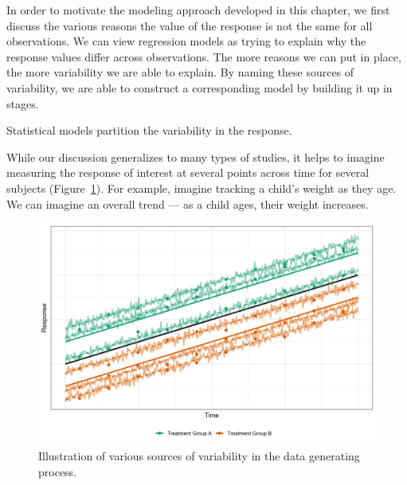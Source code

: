 \documentclass[
  letterpaper,
  DIV=11,
  numbers=noendperiod]{scrreprt}
\theoremstyle{definition}
\theoremstyle{definition}
\theoremstyle{remark}
\begin{document}
In order to motivate the modeling approach developed in this chapter, we
first discuss the various reasons the value of the response is not the
same for all observations. We can view regression models as trying to
explain why the response values differ across observations. The more
reasons we can put in place, the more variability we are able to
explain. By naming these sources of variability, we are able to
construct a corresponding model by building it up in stages.

\begin{tcolorbox}[enhanced jigsaw, bottomrule=.15mm, titlerule=0mm, bottomtitle=1mm, colback=white, coltitle=black, rightrule=.15mm, leftrule=.75mm, toprule=.15mm, toptitle=1mm, left=2mm, opacityback=0, colframe=quarto-callout-tip-color-frame, breakable, title=\textcolor{quarto-callout-tip-color}{\faLightbulb}\hspace{0.5em}{Big Idea}, arc=.35mm, colbacktitle=quarto-callout-tip-color!10!white, opacitybacktitle=0.6]

Statistical models partition the variability in the response.

\end{tcolorbox}

While our discussion generalizes to many types of studies, it helps to
imagine measuring the response of interest at several points across time
for several subjects (Figure~\ref{fig-rm-mixed-models-variability}). For
example, imagine tracking a child's weight as they age. We can imagine
an overall trend --- as a child ages, their weight increases.

\begin{figure}

{\centering \includegraphics{./images/gifvarplotalt.jpg}

}

\caption{\label{fig-rm-mixed-models-variability}Illustration of various
sources of variability in the data generating process.}

\end{figure}
\end{document}
